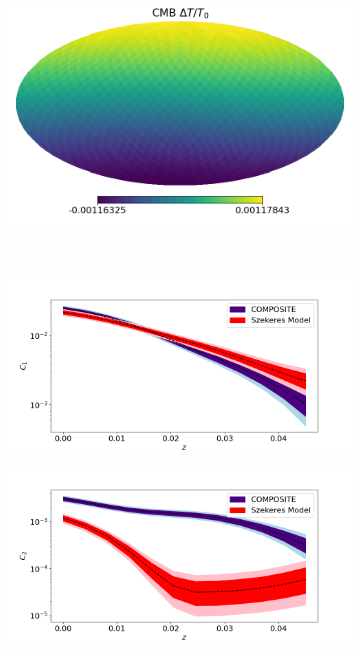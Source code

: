 \documentclass[a4paper,12pt]{report}
\begin{document}
\begin{figure}[tb]
    \centering
    \begin{subfigure}[b]{105mm}
        \centering
        \includegraphics[width=\textwidth]{two structures/COMP only MCMC/0.5 quantile/CMB.png}
        \caption{}
    \end{subfigure}
    \\
    \begin{subfigure}[b]{105mm}
        \centering
        \includegraphics[width=\textwidth]{two structures/COMP only MCMC/0.5 quantile/Hub C1.png}
        \caption{}
    \end{subfigure}
    \hfill
    \begin{subfigure}[b]{105mm}
        \centering
        \includegraphics[width=\textwidth]{two structures/COMP only MCMC/0.5 quantile/Hub C2.png}

\end{subfigure}
\end{figure}
\end{document}
